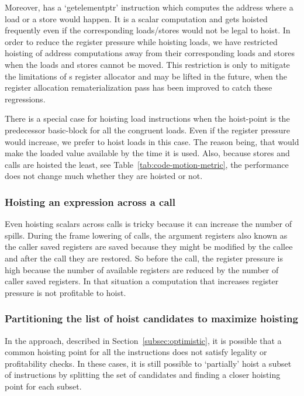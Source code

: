 \documentclass[acmlarge,review,anonymous]{acmart}\settopmatter{printfolios=true}
\begin{document}
Moreover, \LLVM{} has a `getelementptr' instruction which computes the address
where a load or a store would happen. It is a scalar computation and gets
hoisted frequently even if the corresponding loads/stores would not be legal to
hoist.  In order to reduce the register pressure while hoisting loads, we have
restricted hoisting of address computations away from their corresponding loads
and stores when the loads and stores cannot be moved. This restriction is only
to mitigate the limitations of s register allocator and may be lifted in
the future, when the register allocation rematerialization pass has been
improved to catch these regressions.

There is a special case for hoisting load instructions when the hoist-point is
the predecessor basic-block for all the congruent loads. Even if the register
pressure would increase, we prefer to hoist loads in this case. The reason
being, that would make the loaded value available by the time it is used. Also,
because stores and calls are hoisted the least, see
Table~\ref{tab:code-motion-metric}, the performance does not change much whether
they are hoisted or not.


\subsubsection{Hoisting an expression across a call}
\label{cost:across-calls}
Even hoisting scalars across calls is tricky because it can increase the number
of spills. During the frame lowering of calls, the argument registers also known
as the caller saved registers are saved because they might be modified by the
callee and after the call they are restored. So before the call, the register
pressure is high because the number of available registers are reduced by the
number of caller saved registers. In that situation a computation that increases
register pressure is not profitable to hoist.

\subsubsection{Partitioning the list of hoist candidates to maximize hoisting}
\label{subsec:partition}
In the approach, described in Section~\ref{subsec:optimistic}, it is possible
that a common hoisting point for all the instructions does not satisfy legality
or profitability checks. In these cases, it is still possible to `partially'
hoist a subset of instructions by splitting the set of candidates and finding a
closer hoisting point for each subset.
\end{document}
